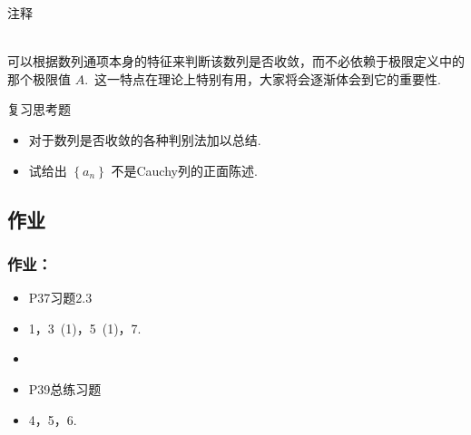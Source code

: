 \documentclass[mathserif]{beamer}
\begin{document}
\begin{frame}{注释}%
	\begin{alertblock}{}
	\suojin {}\\
	\suojin 可以根据数列通项本身的特征来判断该数列是否收敛，而不必依赖于极限定义中的那个极限值 $A$.\ 这一特点在理论上特别有用，大家将会逐渐体会到它的重要性.
	\end{alertblock}
\end{frame}



\begin{frame}{复习思考题}%
	\begin{itemize}
		\item[1.\ ] 对于数列是否收敛的各种判别法加以总结.
		\item[2.\ ] 试给出 $\left\{a_n\right\}$ 不是Cauchy列的正面陈述.
	\end{itemize}
\end{frame}



\subsection*{作业}

\begin{frame}
\frametitle{作业：}
\begin{itemize}
	\item P37\quad 习题2.3
	\item[]
	\begin{center}1，3\ (1)，5\ (1)，7.\end{center}
	\item[]
	\item P39\quad 总练习题
	\item[]
	\begin{center}4，5，6.\end{center}
\end{itemize}
\end{frame}



\end{document}

